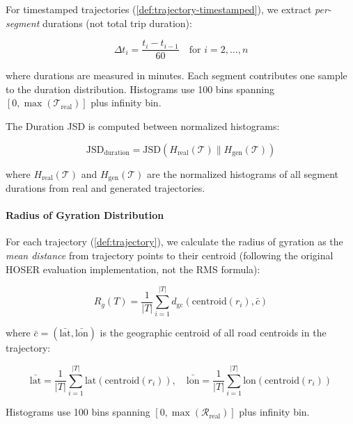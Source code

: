 For timestamped trajectories (\autoref{def:trajectory-timestamped}), we extract \emph{per-segment} durations (not total trip duration):

\begin{equation}
\Delta t_i = \frac{t_i - t_{i-1}}{60} \quad \text{for } i = 2, \ldots, n
\label{eq:segment-duration}
\end{equation}

where durations are measured in minutes. Each segment contributes one sample to the duration distribution. Histograms use 100 bins spanning $[0, \max(\mathcal{T}_{\text{real}})]$ plus infinity bin.

The Duration JSD is computed between normalized histograms:

\begin{equation}
\text{JSD}_{\text{duration}} = \text{JSD}(H_{\text{real}}(\mathcal{T}) \parallel H_{\text{gen}}(\mathcal{T}))
\label{eq:duration-jsd}
\end{equation}

where $H_{\text{real}}(\mathcal{T})$ and $H_{\text{gen}}(\mathcal{T})$ are the normalized histograms of all segment durations from real and generated trajectories.

\paragraph{Radius of Gyration Distribution}

For each trajectory (\autoref{def:trajectory}), we calculate the radius of gyration as the \emph{mean distance} from trajectory points to their centroid (following the original HOSER evaluation implementation, not the RMS formula):

\begin{equation}
R_g(T) = \frac{1}{|T|} \sum_{i=1}^{|T|} d_{\text{gc}}(\text{centroid}(r_i), \bar{c})
\label{eq:radius-gyration}
\end{equation}

where $\bar{c} = (\bar{\text{lat}}, \bar{\text{lon}})$ is the geographic centroid of all road centroids in the trajectory:

\begin{equation}
\bar{\text{lat}} = \frac{1}{|T|} \sum_{i=1}^{|T|} \text{lat}(\text{centroid}(r_i)), \quad
\bar{\text{lon}} = \frac{1}{|T|} \sum_{i=1}^{|T|} \text{lon}(\text{centroid}(r_i))
\label{eq:trajectory-centroid}
\end{equation}

Histograms use 100 bins spanning $[0, \max(\mathcal{R}_{\text{real}})]$ plus infinity bin.


